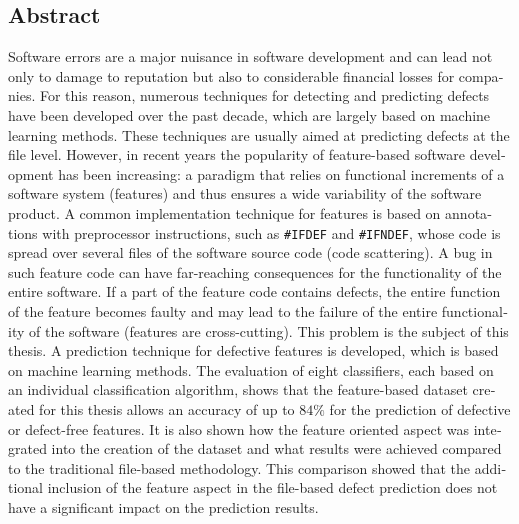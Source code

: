 \begin{otherlanguage}{english}
    \section*{Abstract}
    
Software errors are a major nuisance in software development and can lead not only to damage to reputation but also to considerable financial losses for companies. For this reason, numerous techniques for detecting and predicting defects have been developed over the past decade, which are largely based on machine learning methods. These techniques are usually aimed at predicting defects at the file level. However, in recent years the popularity of feature-based software development has been increasing: a paradigm that relies on functional increments of a software system (features) and thus ensures a wide variability of the software product. A common implementation technique for features is based on annotations with preprocessor instructions, such as \texttt{\#IFDEF} and \texttt{\#IFNDEF}, whose code is spread over several files of the software source code (\glqq code scattering\grqq). A bug in such feature code can have far-reaching consequences for the functionality of the entire software. If a part of the feature code contains defects, the entire function of the feature becomes faulty and may lead to the failure of the entire functionality of the software (features are \glqq cross-cutting\grqq). This problem is the subject of this thesis. A prediction technique for defective features is developed, which is based on machine learning methods. The evaluation of eight classifiers, each based on an individual classification algorithm, shows that the feature-based dataset created for this thesis allows an accuracy of up to $84\%$ for the prediction of defective or defect-free features. It is also shown how the feature oriented aspect was integrated into the creation of the dataset and what results were achieved compared to the traditional file-based methodology. This comparison showed that the additional inclusion of the feature aspect in the file-based defect prediction does not have a significant impact on the prediction results.

\end{otherlanguage}
\cleardoublepage
